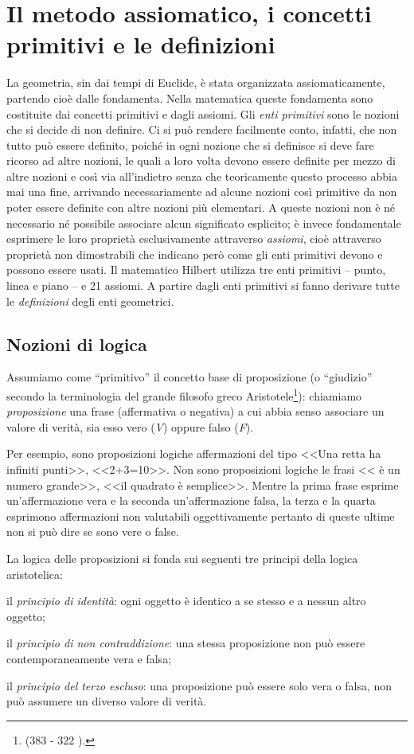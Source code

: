 \section{Il metodo assiomatico, i concetti primitivi e le definizioni}
La geometria, sin dai tempi di Euclide, è stata organizzata assiomaticamente, partendo cioè dalle fondamenta. Nella matematica queste fondamenta sono costituite dai concetti primitivi e dagli assiomi. Gli \emph{enti primitivi} sono le nozioni che si decide di non definire. Ci si può rendere facilmente conto, infatti, che non tutto può essere definito, poiché in ogni nozione che si definisce si deve fare ricorso ad altre nozioni, le quali a loro volta devono essere definite per mezzo di altre nozioni e così via all'indietro senza che teoricamente questo processo abbia mai una fine, arrivando necessariamente ad alcune nozioni così primitive da non poter essere definite con altre nozioni più elementari. A queste nozioni non è né necessario né possibile associare alcun significato esplicito; è invece fondamentale esprimere le loro proprietà esclusivamente attraverso \emph{assiomi}, cioè attraverso proprietà non dimostrabili che indicano però come gli enti primitivi devono e possono essere usati. Il matematico Hilbert utilizza tre enti primitivi -- punto, linea e piano -- e 21 assiomi. A partire dagli enti primitivi si fanno derivare tutte le \emph{definizioni} degli enti geometrici.

\subsection{Nozioni di logica}

Assumiamo come ``primitivo'' il concetto base di proposizione (o ``giudizio'' secondo la terminologia del grande filosofo greco Aristotele\footnote{(383 \aC{} - 322 \aC).}): chiamiamo \emph{proposizione} una frase (affermativa o negativa) a cui abbia senso associare un valore di verità, sia esso vero (\emph{V}) oppure falso (\emph{F}).

Per esempio, sono proposizioni logiche affermazioni del tipo <<Una retta ha infiniti punti>>, <<2+3=10>>. Non sono proposizioni logiche le frasi << è un numero grande>>, <<il quadrato è semplice>>. Mentre la prima frase esprime un'affermazione vera e la seconda un'affermazione falsa, la terza e la quarta esprimono affermazioni non valutabili oggettivamente pertanto di queste ultime non si può dire se sono vere o false.

La logica delle proposizioni si fonda sui seguenti tre principi della logica aristotelica:
\begin{itemize*}
\item il \emph{principio di identità}: ogni oggetto è identico a se stesso e a nessun altro oggetto;
\item il \emph{principio di non contraddizione}: una stessa proposizione non può essere contemporaneamente vera e falsa;
\item il \emph{principio del terzo escluso}: una proposizione può essere solo vera o falsa, non può assumere un diverso valore di verità.
\end{itemize*}

